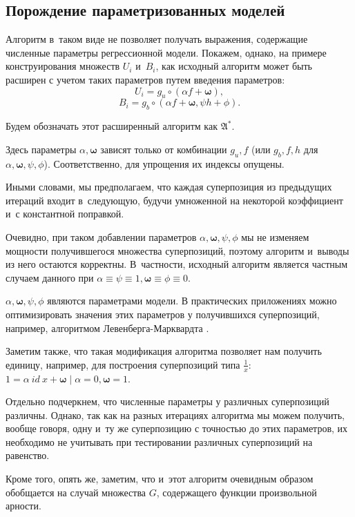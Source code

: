 \documentclass[12pt,a4paper]{amsart}
\begin{document}
\subsection{Порождение параметризованных моделей}
Алгоритм в~таком виде не позволяет получать выражения, содержащие численные
параметры регрессионной модели. Покажем, однако, на примере конструирования
множеств $U_i$ и~$B_i$, как исходный алгоритм может быть расширен с учетом
таких параметров путем введения параметров:
\[
U_i = { g_u \circ (\alpha f + \boldsymbol{\omega}) },
\]
\[
B_i = { g_b \circ (\alpha f + \boldsymbol{\omega}, \psi h + \phi) }.
\]

Будем обозначать этот расширенный алгоритм как $\mathfrak{A}^*$.

Здесь параметры $\alpha, \boldsymbol{\omega}$ зависят только от комбинации
$g_u, f$ (или $g_b, f, h$ для $\alpha, \boldsymbol{\omega}, \psi, \phi$).
Соответственно, для упрощения их индексы опущены.

Иными словами, мы предполагаем, что каждая суперпозиция из предыдущих итераций
входит в~следующую, будучи умноженной на некоторой коэффициент и~с константной
поправкой.

Очевидно, при таком добавлении параметров $\alpha, \boldsymbol{\omega}, \psi, \phi$
мы не изменяем мощности получившегося множества суперпозиций, поэтому
алгоритм и~выводы из него остаются корректны. В~частности, исходный алгоритм
является частным случаем данного при
$\alpha \equiv \psi \equiv 1, \boldsymbol{\omega} \equiv \phi \equiv 0$.

$\alpha, \boldsymbol{\omega}, \psi, \phi$ являются параметрами модели. В
практических приложениях можно оптимизировать значения этих параметров у
получившихся суперпозиций, например, алгоритмом Левенберга-Марквардта
\cite{Marquardt1963Algorithm, more:78}.

Заметим также, что такая модификация алгоритма позволяет нам получить единицу,
например, для построения суперпозиций типа $\frac{1}{x}$:
$1 = \alpha\ id\ x + \boldsymbol{\omega} \mid \alpha = 0, \boldsymbol{\omega} = 1$.

Отдельно подчеркнем, что численные параметры у различных суперпозиций
различны. Однако, так как на разных итерациях алгоритма мы можем получить,
вообще говоря, одну и~ту же суперпозицию с точностью до этих параметров,
их необходимо не учитывать при тестировании различных суперпозиций на
равенство.

Кроме того, опять же, заметим, что и~этот алгоритм очевидным образом
обобщается на случай множества $G$, содержащего функции произвольной арности.
\end{document}
